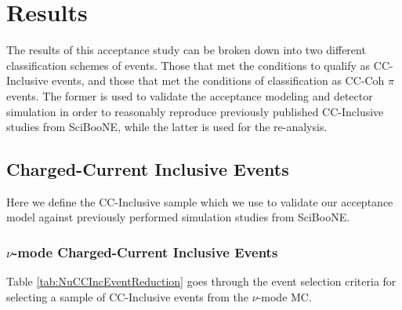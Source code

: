 \documentclass[11pt]{article}
\begin{document}
\section{Results}
\label{sec:Results}
The results of this acceptance study can be broken down into two different classification schemes of events. Those that met the conditions to qualify as CC-Inclusive events, and those that met the conditions of classification as CC-Coh $\pi$ events. The former is used to validate the acceptance modeling and detector simulation in order to reasonably reproduce previously published CC-Inclusive studies from SciBooNE, while the latter is used for the re-analysis.

\subsection{Charged-Current Inclusive Events}
\label{sub:CCInclusive}

Here we define the CC-Inclusive sample which we use to validate our acceptance model against previously performed simulation studies from SciBooNE.

\subsubsection{$\nu$-mode Charged-Current Inclusive Events}
\label{subsub:NuModeCCInclusive}
Table \ref*{tab:NuCCIncEventReduction} goes through the event selection criteria for selecting a sample of CC-Inclusive events from the $\nu$-mode MC.
\end{document}
